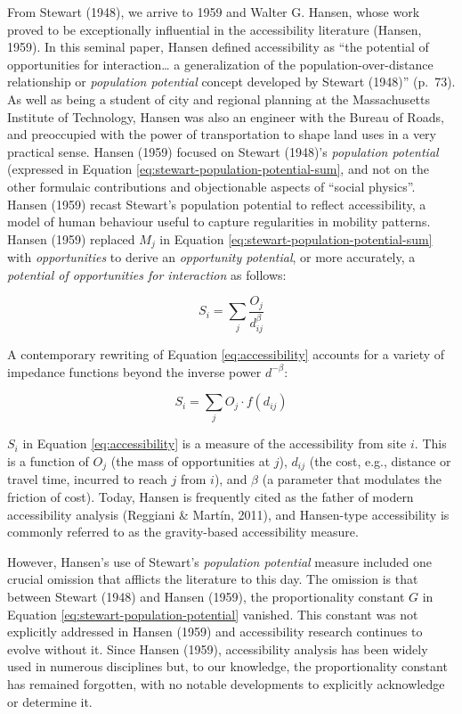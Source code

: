 \documentclass[
11pt, %
oneside, %
english, %
singlespacing, %
]{macthesis} %
\begin{document}
From Stewart (1948), we arrive to 1959 and Walter G. Hansen, whose work proved to be exceptionally influential in the accessibility literature (Hansen, 1959). In this seminal paper, Hansen defined accessibility as ``the potential of opportunities for interaction\ldots{} a generalization of the population-over-distance relationship or \emph{population potential} concept developed by Stewart (1948)'' (p.~73). As well as being a student of city and regional planning at the Massachusetts Institute of Technology, Hansen was also an engineer with the Bureau of Roads, and preoccupied with the power of transportation to shape land uses in a very practical sense. Hansen (1959) focused on Stewart (1948)'s \emph{population potential} (expressed in Equation \ref{eq:stewart-population-potential-sum}, and not on the other formulaic contributions and objectionable aspects of ``social physics''. Hansen (1959) recast Stewart's population potential to reflect accessibility, a model of human behaviour useful to capture regularities in mobility patterns. Hansen (1959) replaced \(M_j\) in Equation \ref{eq:stewart-population-potential-sum} with \emph{opportunities} to derive an \emph{opportunity potential}, or more accurately, a \emph{potential of opportunities for interaction} as follows:

\begin{equation}
\label{eq:accessibility}
S_{i} = \sum_j \frac{O_j }{d_{ij}^\beta}
\end{equation} 

A contemporary rewriting of Equation \ref{eq:accessibility} accounts for a variety of impedance functions beyond the inverse power \(d^{-\beta}\):

\begin{equation}
\label{eq:accessibility-general}
S_{i} = \sum_j O_j \cdot f(d_{ij})
\end{equation} 

\(S_{i}\) in Equation \ref{eq:accessibility} is a measure of the accessibility from site \(i\). This is a function of \(O_j\) (the mass of opportunities at \(j\)), \(d_{ij}\) (the cost, e.g., distance or travel time, incurred to reach \(j\) from \(i\)), and \(\beta\) (a parameter that modulates the friction of cost). Today, Hansen is frequently cited as the father of modern accessibility analysis (Reggiani \& Martín, 2011), and Hansen-type accessibility is commonly referred to as the gravity-based accessibility measure.

However, Hansen's use of Stewart's \emph{population potential} measure included one crucial omission that afflicts the literature to this day. The omission is that between Stewart (1948) and Hansen (1959), the proportionality constant \(G\) in Equation \ref{eq:stewart-population-potential} vanished. This constant was not explicitly addressed in Hansen (1959) and accessibility research continues to evolve without it. Since Hansen (1959), accessibility analysis has been widely used in numerous disciplines but, to our knowledge, the proportionality constant has remained forgotten, with no notable developments to explicitly acknowledge or determine it.
\end{document}

